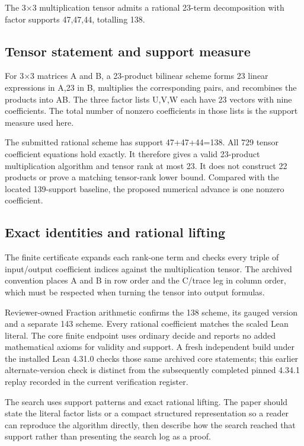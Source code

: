 \documentclass[11pt,a4paper]{article}
\begin{document}
The 3\ensuremath{\times}3 multiplication tensor admits a rational 23-term decomposition with factor supports 47,47,44, totalling 138.

\subsection{Tensor statement and support measure}
For 3\ensuremath{\times}3 matrices A and B, a 23-product bilinear scheme forms 23 linear expressions in A,23 in B, multiplies the corresponding pairs, and recombines the products into AB. The three factor lists U,V,W each have 23 vectors with nine coefficients. The total number of nonzero coefficients in those lists is the support measure used here.

The submitted rational scheme has support 47+47+44=138. All 729 tensor coefficient equations hold exactly. It therefore gives a valid 23-product multiplication algorithm and tensor rank at most 23. It does not construct 22 products or prove a matching tensor-rank lower bound. Compared with the located 139-support baseline, the proposed numerical advance is one nonzero coefficient.

\subsection{Exact identities and rational lifting}
The finite certificate expands each rank-one term and checks every triple of input/output coefficient indices against the multiplication tensor. The archived convention places A and B in row order and the C/trace leg in column order, which must be respected when turning the tensor into output formulas.

Reviewer-owned Fraction arithmetic confirms the 138 scheme, its gauged version and a separate 143 scheme. Every rational coefficient matches the scaled Lean literal. The core finite endpoint uses ordinary decide and reports no added mathematical axioms for validity and support. A fresh independent build under the installed Lean 4.31.0 checks those same archived core statements; this earlier alternate-version check is distinct from the subsequently completed pinned 4.34.1 replay recorded in the current verification register.

The search uses support patterns and exact rational lifting. The paper should state the literal factor lists or a compact structured representation so a reader can reproduce the algorithm directly, then describe how the search reached that support rather than presenting the search log as a proof.
\end{document}
